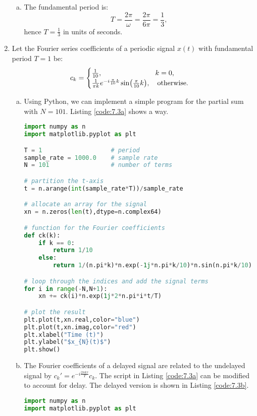 \begin{enumerate}
\begin{enumerate}[a)]
\item The fundamental period is:
$$T=\frac{2\pi}{\omega}=\frac{2\pi}{6\pi}=\frac{1}{3},$$
hence $T=\frac{1}{3}$ in units of seconds.
\end{enumerate}

\item Let the Fourier series coefficients of a periodic signal $x(t)$ with fundamental period $T=1$ be:
$$c_{k}=\begin{cases}
    \frac{1}{10}, \hspace{2.3cm}\quad k=0, \\
    \frac{1}{\pi k}e^{-i\frac{\pi}{10}k}\sin(\frac{\pi}{10}k),\quad \text{otherwise}.
\end{cases}$$

\begin{enumerate}[a)]
\item Using Python, we can implement a simple program for the partial sum with $N=101$. Listing \ref{code:7.3a} shows a way. 
\begin{lstlisting}[language=Python, caption=Suggested solution to a),label=code:7.3a]
import numpy as n
import matplotlib.pyplot as plt

T = 1                   # period
sample_rate = 1000.0    # sample rate
N = 101                 # number of terms 

# partition the t-axis
t = n.arange(int(sample_rate*T))/sample_rate

# allocate an array for the signal
xn = n.zeros(len(t),dtype=n.complex64)

# function for the Fourier coefficients
def ck(k):
    if k == 0:
        return 1/10
    else:
        return 1/(n.pi*k)*n.exp(-1j*n.pi*k/10)*n.sin(n.pi*k/10)

# loop through the indices and add the signal terms
for i in range(-N,N+1):
    xn += ck(i)*n.exp(1j*2*n.pi*i*t/T)

# plot the result
plt.plot(t,xn.real,color="blue")
plt.plot(t,xn.imag,color="red")
plt.xlabel("Time (t)")
plt.ylabel("$x_{N}(t)$")
plt.show()
\end{lstlisting}

\item The Fourier coefficients of a delayed signal are related to the undelayed signal by $c_{k}'=e^{-i\frac{2\pi k\tau}{T}}c_{k}$. 
The script in Listing \ref{code:7.3a} can be modified to account for delay. The delayed version is shown in Listing \ref{code:7.3b}.
\begin{lstlisting}[language=Python, caption=Suggested solution to b),label=code:7.3b]
import numpy as n
import matplotlib.pyplot as plt


\end{lstlisting}
\end{enumerate}
\end{enumerate}
